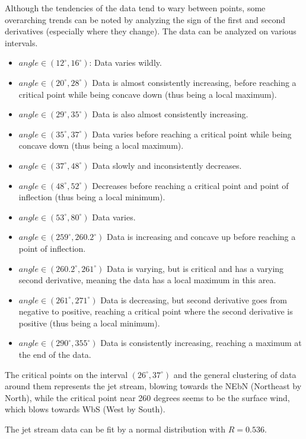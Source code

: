 \documentclass{journal}
\begin{document}
Although the tendencies of the data tend to wary between points, some overarching trends can be noted by analyzing the sign of the first and second derivatives (especially where they change).
The data can be analyzed on various intervals.
\begin{itemize}
  \item $angle \in (12^{\circ},16^{\circ})$: Data varies wildly.
  \item $angle \in (20^{\circ}, 28^{\circ})$ Data is almost consistently increasing, before reaching a critical point while being concave down (thus being a local maximum).
  \item $angle \in (29^{\circ}, 35^{\circ})$ Data is also almost consistently increasing.
  \item $angle \in (35^{\circ}, 37^{\circ})$ Data varies before reaching a critical point while being concave down (thus being a local maximum).
  \item $angle \in (37^{\circ}, 48^{\circ})$ Data slowly and inconsistently decreases.
  \item $angle \in (48^{\circ}, 52^{\circ})$ Decreases before reaching a critical point and point of inflection (thus being a local minimum).
  \item $angle \in (53^{\circ}, 80^{\circ})$ Data varies.
  \item $angle \in (259^{\circ}, 260.2^{\circ})$ Data is increasing and concave up before reaching a point of inflection.
  \item $angle \in (260.2^{\circ}, 261^{\circ})$ Data is varying, but is critical and has a varying second derivative, meaning the data has a local maximum in this area.
  \item $angle \in (261^{\circ}, 271^{\circ})$ Data is decreasing, but second derivative goes from negative to positive, reaching a critical point where the second derivative is positive (thus being a local minimum).
  \item $angle \in (290^{\circ}, 355^{\circ})$ Data is consistently increasing, reaching a maximum at the end of the data.
\end{itemize}

The critical points on the interval $(26^{\circ}, 37^{\circ})$ and the general clustering of data around them represents the jet stream, blowing towards the NEbN (Northeast by North), while the critical point near 260 degrees seems to be the surface wind, which blows towards WbS (West by South).

The jet stream data can be fit by a normal distribution with $R = 0.536$.
\end{document}
